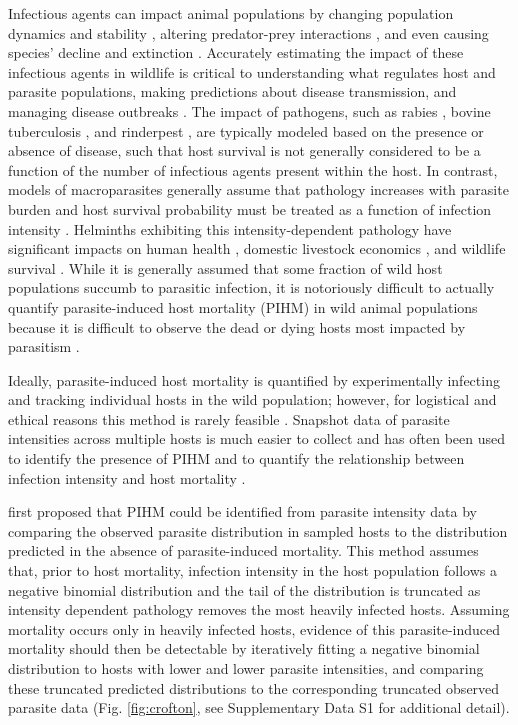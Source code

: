 \documentclass[12pt, a4paper]{article}
\begin{document}
Infectious agents can impact animal populations by changing
population dynamics and stability \citep{Dobson1992,Tompkins2002}, altering predator-prey interactions \citep{Joly2004}, and
even causing species' decline and extinction \citep{DeCastro2005a,McCallum2012b}. Accurately estimating the impact
of these infectious agents in wildlife is critical to understanding what
regulates host and parasite populations, making predictions about disease
transmission, and managing disease outbreaks \citep{Langwig2015}. The impact of pathogens, such as rabies \citep{Coyne1989}, bovine tuberculosis \citep{Cox2005}, and
rinderpest \citep{Tille1991}, are typically modeled based on the presence or absence of disease, such that host survival is not generally considered to be a function of the number of infectious agents present within the host.  In contrast, models of macroparasites generally assume that pathology increases with parasite burden and host survival probability must be treated as a function of infection intensity \citep{AndersonandMay1978}. Helminths exhibiting this intensity-dependent pathology have significant impacts on human health \citep{Brooker2004}, domestic livestock economics \citep{Roeber2013}, and wildlife survival \citep{Kirk2003,Logiudice2003}. While it is generally assumed that some fraction of wild host populations succumb to parasitic infection, it is notoriously difficult to actually quantify parasite-induced host mortality (PIHM) in wild animal populations because it is difficult to observe the dead or dying hosts most impacted by parasitism \citep{McCallum2000a}.

Ideally, parasite-induced host mortality is
quantified by experimentally infecting and tracking individual hosts in the
wild population; however, for logistical and ethical reasons this method is
rarely feasible \citep{McCallum2000a}. Snapshot data of parasite intensities across multiple hosts is much easier to collect and has
often been used to identify the presence of PIHM \citep{Crofton1971a,Lester1977,Lester1984,Lanciani1989,Royce1990,Ferguson2011} and to quantify the
relationship between infection intensity and host mortality \citep{Adjei1986}.

\cite{Crofton1971a} first proposed that PIHM could be identified from parasite intensity data by comparing the
observed parasite distribution in sampled hosts to the distribution
predicted in the absence of parasite-induced mortality. This method
assumes that, prior to host mortality, infection intensity in the host population follows a negative binomial distribution and the tail of the distribution is truncated as intensity dependent pathology removes the most heavily infected hosts. Assuming mortality occurs only in heavily infected hosts, evidence of this parasite-induced mortality should then be detectable by iteratively
fitting a negative binomial distribution to hosts with lower and lower parasite intensities, and comparing these truncated predicted distributions to the corresponding truncated observed parasite data (Fig. \ref{fig:crofton}, see Supplementary Data S1 for additional detail).
\end{document}
